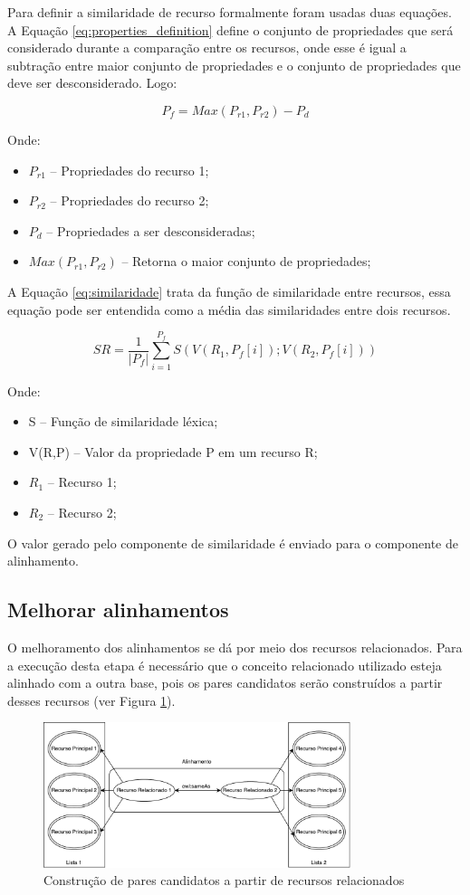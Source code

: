 Para definir a similaridade de recurso formalmente foram usadas duas equações. A Equação \ref{eq:properties_definition} define o conjunto de propriedades que será considerado durante a comparação entre os recursos, onde esse é igual a subtração entre maior conjunto de propriedades e o conjunto de propriedades que deve ser desconsiderado. Logo:

\begin{equation}
P_f =M a x  ( P_{r1} ,P_{r2} ) - P_d
\label{eq:properties_definition}
\end{equation}

Onde:
\begin{itemize}
	\item $P_{r1}$ – Propriedades do recurso 1;
	\item $P_{r2}$ –  Propriedades do recurso 2;
	\item $P_d$ –  Propriedades a ser desconsideradas;
	\item $M a x  ( P_{r1} ,P_{r2} )$ – Retorna o maior conjunto de propriedades;
\end{itemize}

A Equação \ref{eq:similaridade} trata da função de similaridade entre recursos, essa equação pode ser entendida como a média das similaridades entre dois recursos.

\begin{equation}
SR  = \frac{1}{|P_f|} { \sum_{i = 1}^{P_f} {S(V(R_1,P_f[i]);V(R_2,P_f[i]))}}
\label{eq:similaridade}
\end{equation}

Onde:

\begin{itemize}
	\item S – Função de similaridade léxica;
	\item V(R,P) – Valor da propriedade P em um recurso R;
	\item $R_1$ – Recurso 1;
	\item $R_2$ – Recurso 2;
\end{itemize}

O valor gerado pelo componente de similaridade é enviado para o componente de alinhamento.

\subsection*{Melhorar alinhamentos}
O melhoramento dos alinhamentos se dá por meio dos recursos relacionados. Para a execução desta etapa é necessário que o conceito relacionado utilizado esteja alinhado com a outra base, pois os pares candidatos serão construídos a partir desses recursos (ver Figura \ref{fig:relacionados}).

\begin{figure}[!ht]
	\centering
	\includegraphics[width=0.8\textwidth]{./imagens/relacionados.pdf}
    \caption{Construção de pares candidatos a partir de recursos relacionados}
	\label{fig:relacionados}
\end{figure}
